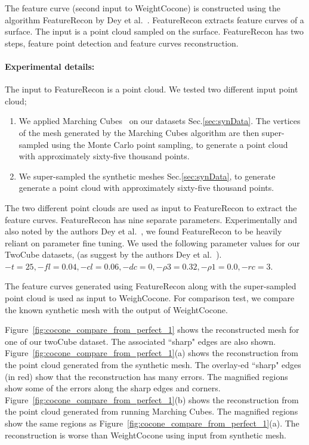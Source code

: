The feature curve (second input to WeightCocone) is constructed using the algorithm FeatureRecon by Dey et al.~\cite{Dey2013}. FeatureRecon extracts feature curves of a surface. The input is a point cloud sampled on the surface. FeatureRecon has two steps, feature point detection and feature curves reconstruction. 
\paragraph{Experimental details:} The input to FeatureRecon is a point cloud. We tested two different input point cloud;
\begin{enumerate}
	\item We applied Marching Cubes~\cite{lc-mchr3-87} on our datasets Sec.\ref{sec:synData}. The vertices of the mesh generated by the Marching Cubes algorithm are then super-sampled using the Monte Carlo point sampling, to generate a point cloud with approximately sixty-five thousand points.
	\item We super-sampled the synthetic meshes Sec.\ref{sec:synData}, to generate generate a point cloud with approximately sixty-five thousand points.
\end{enumerate}
The two different point clouds are used as input to FeatureRecon to extract the feature curves. 
FeatureRecon has nine separate parameters. Experimentally and also noted by the authors Dey et al.~\cite{Dey2013}, we found FeatureRecon to be heavily reliant on parameter fine tuning. We used the following parameter values for our TwoCube datasets, (as suggest by the authors Dey et al.~\cite{Dey2013}). 
$-t = 25,-fl = 0.04, -cl = 0.06, -dc = 0, -\rho3 = 0.32, -\rho1 = 0.0, -rc = 3$.

The feature curves generated using FeatureRecon along with the super-sampled point cloud is used as input to WeighCocone. For comparison test, we compare the known synthetic mesh with the output of WeightCocone.

Figure~\ref{fig:cocone_compare_from_perfect_1} shows the reconstructed mesh for one of our twoCube dataset. The associated ``sharp" edges are also shown. Figure~\ref{fig:cocone_compare_from_perfect_1}(a) shows the reconstruction from the point cloud generated from the synthetic mesh. The overlay-ed ``sharp" edges (in red) show that the reconstruction has many errors. The magnified regions show some of the errors along the sharp edges and corners. Figure~\ref{fig:cocone_compare_from_perfect_1}(b) shows the reconstruction from the point cloud generated from running Marching Cubes. The magnified regions show the same regions as Figure~\ref{fig:cocone_compare_from_perfect_1}(a). The reconstruction is worse than WeightCocone using input from synthetic mesh. 

